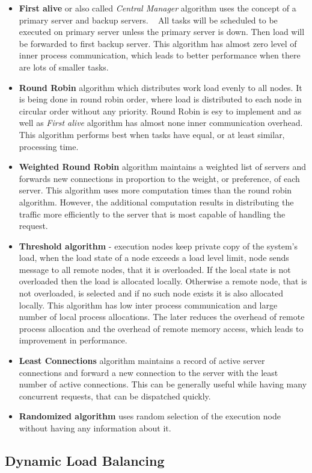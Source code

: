 \begin{itemize}
    \item \textbf{First alive} or also called \textit{Central Manager} algorithm uses the concept of a primary server and backup servers.
    ~\cite{web:ibmLoadBalancingDecisions}
    All tasks will be scheduled to be executed on primary server unless the primary server is down.
    Then load will be forwarded to first backup server.
    This algorithm has almost zero level of inner process communication, which leads to better performance when there are lots of smaller tasks.

    \item \textbf{Round Robin} algorithm which distributes work load evenly to all nodes.
    It is being done in round robin order, where load is distributed to each node in circular order without any priority.
    Round Robin is esy to implement and as well as \textit{First alive} algorithm has almost none inner communication overhead.
    This algorithm performs best when tasks have equal, or at least similar, processing time.

    \item \textbf{Weighted Round Robin} algorithm maintains a weighted list of servers and forwards new connections in proportion to the weight, or preference,
    of each server.
    This algorithm uses more computation times than the round robin algorithm.
    However, the additional computation results in distributing the traffic more efficiently to the server that is most capable of handling the request.
    ~\cite{web:ibmLoadBalancingDecisions}

    \item \textbf{Threshold algorithm} - execution nodes keep private copy of the system's load, when the load state of a node exceeds a load level limit,
    node sends message to all remote nodes, that it is overloaded.
    If the local state is not overloaded then the load is allocated locally.
    Otherwise a remote node, that is not overloaded, is selected and if no such node exists it is also allocated locally.
    This algorithm has low inter process communication and large number of local process allocations.
    The later reduces the overhead of remote process allocation and the overhead of remote memory access,
    which leads to improvement in performance.\cite{web:qDifferenceBetweenStaticAndDynamicBalancing}

    \item \textbf{Least Connections} algorithm maintains a record of active server connections
    and forward a new connection to the server with the least number of active connections.\cite{web:ibmLoadBalancingDecisions}
    This can be generally useful while having many concurrent requests, that can be dispatched quickly.

    \item \textbf{Randomized algorithm} uses random selection of the execution node without having any information about it.

\end{itemize}

\subsection{Dynamic Load Balancing}\label{subsec:dynamic-load-balancing}

